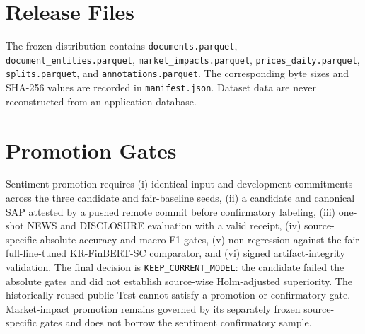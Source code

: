 \documentclass[11pt]{article}
\begin{document}


\appendix
\section{Release Files}

The frozen distribution contains \texttt{documents.parquet}, \texttt{document\_entities.parquet}, \texttt{market\_impacts.parquet}, \texttt{prices\_daily.parquet}, \texttt{splits.parquet}, and \texttt{annotations.parquet}. The corresponding byte sizes and SHA-256 values are recorded in \texttt{manifest.json}. Dataset data are never reconstructed from an application database.

\section{Promotion Gates}

Sentiment promotion requires (i) identical input and development commitments across the three candidate and fair-baseline seeds, (ii) a candidate and canonical SAP attested by a pushed remote commit before confirmatory labeling, (iii) one-shot NEWS and DISCLOSURE evaluation with a valid receipt, (iv) source-specific absolute accuracy and macro-F1 gates, (v) non-regression against the fair full-fine-tuned KR-FinBERT-SC comparator, and (vi) signed artifact-integrity validation. The final decision is \texttt{KEEP\_CURRENT\_MODEL}: the candidate failed the absolute gates and did not establish source-wise Holm-adjusted superiority. The historically reused public Test cannot satisfy a promotion or confirmatory gate. Market-impact promotion remains governed by its separately frozen source-specific gates and does not borrow the sentiment confirmatory sample.
\end{document}
